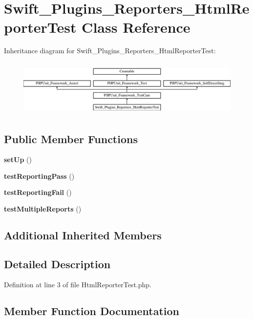 \section{Swift\+\_\+\+Plugins\+\_\+\+Reporters\+\_\+\+Html\+Reporter\+Test Class Reference}
\label{class_swift___plugins___reporters___html_reporter_test}
Inheritance diagram for Swift\+\_\+\+Plugins\+\_\+\+Reporters\+\_\+\+Html\+Reporter\+Test\+:\begin{figure}[H]
\begin{center}
\leavevmode
\includegraphics[height=2.871795cm]{class_swift___plugins___reporters___html_reporter_test}
\end{center}
\end{figure}
\subsection*{Public Member Functions}
\begin{DoxyCompactItemize}
\item 
{\bf set\+Up} ()
\item 
{\bf test\+Reporting\+Pass} ()
\item 
{\bf test\+Reporting\+Fail} ()
\item 
{\bf test\+Multiple\+Reports} ()
\end{DoxyCompactItemize}
\subsection*{Additional Inherited Members}


\subsection{Detailed Description}


Definition at line 3 of file Html\+Reporter\+Test.\+php.



\subsection{Member Function Documentation}

